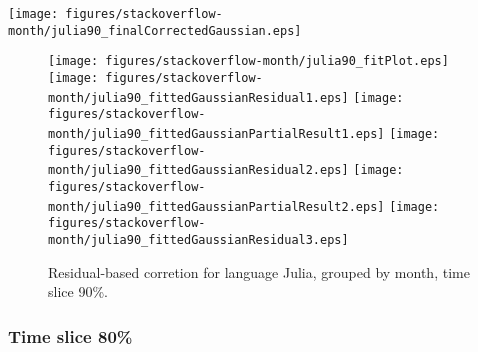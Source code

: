 \begin{center}
{\texttt{[image: figures/stackoverflow-month/julia90\_finalCorrectedGaussian.eps]}}
\end{center}

\FloatBarrier

\begin{figure}[t]
\centering
{}
{\texttt{[image: figures/stackoverflow-month/julia90\_fitPlot.eps]}}
{\texttt{[image: figures/stackoverflow-month/julia90\_fittedGaussianResidual1.eps]}}
{\texttt{[image: figures/stackoverflow-month/julia90\_fittedGaussianPartialResult1.eps]}}
{\texttt{[image: figures/stackoverflow-month/julia90\_fittedGaussianResidual2.eps]}}
{\texttt{[image: figures/stackoverflow-month/julia90\_fittedGaussianPartialResult2.eps]}}
{\texttt{[image: figures/stackoverflow-month/julia90\_fittedGaussianResidual3.eps]}}
\caption{Residual-based corretion for language Julia, grouped by month, time slice 90\%.}
\end{figure}


\FloatBarrier


\subsubsection{Time slice 80\%}

